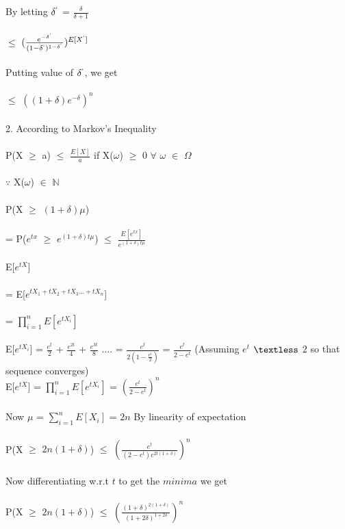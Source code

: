 \documentclass{article}
\begin{document}
By letting $\delta^{`}$ = $\frac{\delta}{\delta + 1}$ \\\\ 
$\leq$ $(\frac{e^{-\delta^{`}}}{(1 - \delta^{`})^{1 - \delta^{`}}})^{E[X^{`}]}$\\\\
Putting value of $\delta^{`}$, we get \\\\ 
$\leq$ $((1 + \delta)e^{-\delta})^{n}$ \\\\
2.
According to Markov's Inequality \\\\
P(X $\geq$ a) $\leq$ $\frac{E[X]}{a}$ if X($\omega$) $\geq$ 0 $\forall$ $\omega$ $\in$ $\Omega$ \\\\
$\because$ X($\omega$) $\in$ $\mathbb{N}$ \\\\ 
P(X $\geq$ $(1 + \delta)\mu$) \\\\
= P($e^{tx}$ $\geq$ $e^{(1 + \delta)t\mu}$) $\leq$ $\frac{E[e^{tx}]}{e^{(1 + \delta)t\mu}}$\\\\
E[$e^{tX}$] \\\\
= E[$e^{tX_1 + tX_2 + tX_3 ... + tX_n}$] \\\\
=  $\prod_{i=1}^{n} E[e^{tX_i}]$ \\\\
E[$e^{tX_i}$] = $\frac{e^{t}}{2}$ + $\frac{e^{2t}}{4}$ + $\frac{e^{3t}}{8}$ .... 
= $\frac{e^{t}}{2(1-\frac{e^{t}}{2})}$
= $\frac{e^{t}}{2 - e^{t}}$ \hfill{(Assuming $e^{t}$ $\textless$ $2$ so that sequence converges) }\\
E[$e^{tX}$] = $\prod_{i=1}^{n} E[e^{tX_i}]$ = $(\frac{e^{t}}{2 - e^{t}})^{n}$ \\\\
Now $\mu$ = $\sum_{i=1}^{n}E[X_i]$ = $2n$ \hfill{By linearity of expectation}\\\\ %
P(X $\geq$ $2n(1 + \delta)$) $\leq$ $(\frac{e^{t}}{(2 - e^{t})e^{2t(1+\delta)}})^{n}$\\\\
Now differentiating w.r.t $t$ to get the $minima$ we get \\\\
P(X $\geq$ $2n(1+\delta)$) $\leq$ $(\frac{(1+\delta)^{2(1+\delta)}}{(1+2\delta)^{1+2\delta}})^{n}$ \\\\
\end{document}
